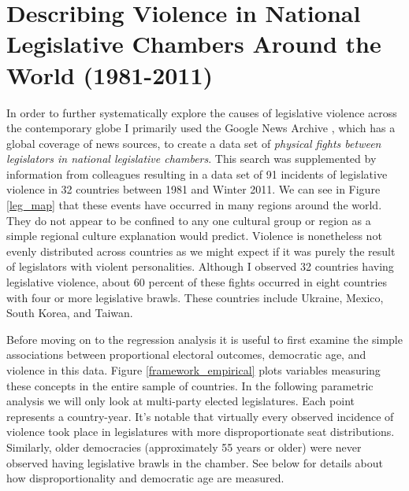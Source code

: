 \documentclass[a4paper]{article}\usepackage[]{graphicx}\usepackage[]{color}
\begin{document}
\section{Describing Violence in National Legislative Chambers Around the World (1981-2011)}

In order to further systematically explore the causes of legislative violence across the contemporary globe I primarily used the Google News Archive \citep{GoogleNews2011}, which has a global coverage of news sources, to create a data set of {\emph{physical fights between legislators in national legislative chambers}}. This search was supplemented by information from colleagues resulting in a data set of 91 incidents of legislative violence in 32 countries between 1981 and Winter 2011. We can see in Figure \ref{leg_map} that these events have occurred in many regions around the world. They do not appear to be confined to any one cultural group or region as a simple regional culture explanation would predict. Violence is nonetheless not evenly distributed across countries as we might expect if it was purely the result of legislators with violent personalities. Although I observed 32 countries having legislative violence, about 60 percent of these fights occurred in eight countries with four or more legislative brawls. These countries include Ukraine, Mexico, South Korea, and Taiwan.

Before moving on to the regression analysis it is useful to first examine the simple associations between proportional electoral outcomes, democratic age, and violence in this data. Figure \ref{framework_empirical} plots variables measuring these concepts in the entire sample of countries. In the following parametric analysis we will only look at multi-party elected legislatures. Each point represents a country-year. It's notable that virtually every observed incidence of violence took place in legislatures with more disproportionate seat distributions. Similarly, older democracies (approximately 55 years or older) were never observed having legislative brawls in the chamber. See below for details about how disproportionality and democratic age are measured.
\end{document}
